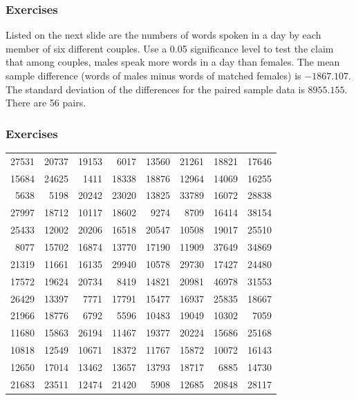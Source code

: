 \documentclass[xcolor=dvipsnames]{beamer}
\begin{document}
\begin{frame}
  \frametitle{Exercises}
   Listed on the next slide are the numbers
  of words spoken in a day by each member of six different couples.
  Use a 0.05 significance level to test the claim that among couples,
  males speak more words in a day than females. The mean sample
  difference (words of males minus words of matched females) is
  $-1867.107$. The standard deviation of the differences for the
  paired sample data is $8955.155$. There are 56 pairs.
\end{frame}

\begin{frame}
  \frametitle{Exercises}
\begin{tabular}{|rr|rr|rr|rr|}
27531 & 20737 & 19153 &  6017 & 13560 & 21261 & 18821 & 17646 \\
15684 & 24625 &  1411 & 18338 & 18876 & 12964 & 14069 & 16255 \\
 5638 &  5198 & 20242 & 23020 & 13825 & 33789 & 16072 & 28838 \\
27997 & 18712 & 10117 & 18602 &  9274 &  8709 & 16414 & 38154 \\
25433 & 12002 & 20206 & 16518 & 20547 & 10508 & 19017 & 25510 \\
 8077 & 15702 & 16874 & 13770 & 17190 & 11909 & 37649 & 34869 \\
21319 & 11661 & 16135 & 29940 & 10578 & 29730 & 17427 & 24480 \\
17572 & 19624 & 20734 &  8419 & 14821 & 20981 & 46978 & 31553 \\
26429 & 13397 &  7771 & 17791 & 15477 & 16937 & 25835 & 18667 \\
21966 & 18776 &  6792 &  5596 & 10483 & 19049 & 10302 &  7059 \\
11680 & 15863 & 26194 & 11467 & 19377 & 20224 & 15686 & 25168 \\
10818 & 12549 & 10671 & 18372 & 11767 & 15872 & 10072 & 16143 \\
12650 & 17014 & 13462 & 13657 & 13793 & 18717 &  6885 & 14730 \\
21683 & 23511 & 12474 & 21420 &  5908 & 12685 & 20848 & 28117 \\
\end{tabular}
\end{frame}

\end{document}
